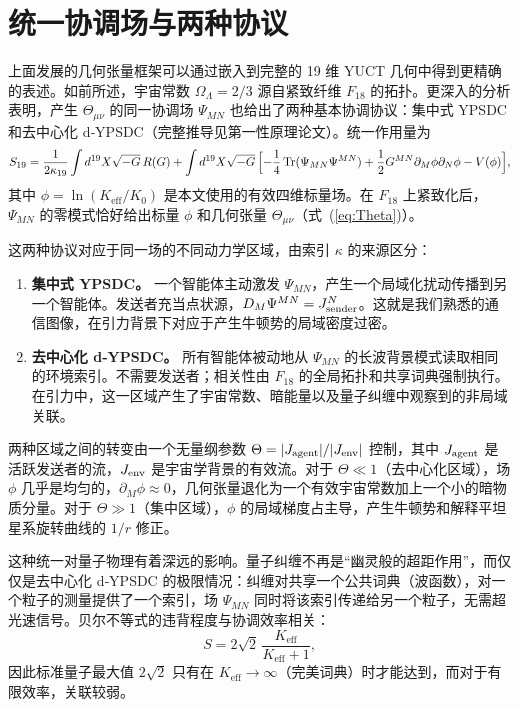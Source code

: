 \documentclass[12pt,a4paper]{article}
\DeclareMathOperator{\Tr}{Tr}
\begin{document}
	\section{统一协调场与两种协议}
	\label{sec:unified-protocols}
	
	上面发展的几何张量框架可以通过嵌入到完整的 19 维 YUCT 几何中得到更精确的表述。如前所述，宇宙常数 \(\Omega_\Lambda=2/3\) 源自紧致纤维 \(F_{18}\) 的拓扑。更深入的分析表明，产生 \(\Theta_{\mu\nu}\) 的同一协调场 \(\Psi_{MN}\) 也给出了两种基本协调协议：集中式 YPSDC 和去中心化 d‑YPSDC（完整推导见第一性原理论文）。统一作用量为
	\begin{equation}
		S_{19} = \frac{1}{2\kappa_{19}} \int d^{19}X \sqrt{-G}\, R(G)
		+ \int d^{19}X \sqrt{-G}\,
		\Bigl[ -\frac14 \Tr(\Psi_{MN}\Psi^{MN})
		+ \frac12 G^{MN}\partial_M\phi \partial_N\phi
		- V(\phi) \Bigr],
		\label{eq:unified-gravity}
	\end{equation}
	其中 \(\phi = \ln(K_{\mathrm{eff}}/K_0)\) 是本文使用的有效四维标量场。在 \(F_{18}\) 上紧致化后，\(\Psi_{MN}\) 的零模式恰好给出标量 \(\phi\) 和几何张量 \(\Theta_{\mu\nu}\)（式~(\ref{eq:Theta})）。
	
	这两种协议对应于同一场的不同动力学区域，由索引 \(\kappa\) 的来源区分：
	\begin{enumerate}[leftmargin=*]
		\item \textbf{集中式 YPSDC。} 一个智能体主动激发 \(\Psi_{MN}\)，产生一个局域化扰动传播到另一个智能体。发送者充当点状源，\(D_M\Psi^{MN} = J^N_{\rm sender}\)。这就是我们熟悉的通信图像，在引力背景下对应于产生牛顿势的局域密度过密。
		\item \textbf{去中心化 d‑YPSDC。} 所有智能体被动地从 \(\Psi_{MN}\) 的长波背景模式读取相同的环境索引。不需要发送者；相关性由 \(F_{18}\) 的全局拓扑和共享词典强制执行。在引力中，这一区域产生了宇宙常数、暗能量以及量子纠缠中观察到的非局域关联。
	\end{enumerate}
	
	两种区域之间的转变由一个无量纲参数 \(\Theta = |J_{\rm agent}| / |J_{\rm env}|\) 控制，其中 \(J_{\rm agent}\) 是活跃发送者的流，\(J_{\rm env}\) 是宇宙学背景的有效流。对于 \(\Theta\ll1\)（去中心化区域），场 \(\phi\) 几乎是均匀的，\(\partial_M\phi\approx0\)，几何张量退化为一个有效宇宙常数加上一个小的暗物质分量。对于 \(\Theta\gg1\)（集中区域），\(\phi\) 的局域梯度占主导，产生牛顿势和解释平坦星系旋转曲线的 \(1/r\) 修正。
	
	这种统一对量子物理有着深远的影响。量子纠缠不再是“幽灵般的超距作用”，而仅仅是去中心化 d‑YPSDC 的极限情况：纠缠对共享一个公共词典（波函数），对一个粒子的测量提供了一个索引，场 \(\Psi_{MN}\) 同时将该索引传递给另一个粒子，无需超光速信号。贝尔不等式的违背程度与协调效率相关：
	\begin{equation}
		S = 2\sqrt{2}\,\frac{K_{\mathrm{eff}}}{K_{\mathrm{eff}}+1},
		\label{eq:bell-eff}
	\end{equation}
	因此标准量子最大值 \(2\sqrt{2}\) 只有在 \(K_{\mathrm{eff}}\to\infty\)（完美词典）时才能达到，而对于有限效率，关联较弱。
	
\end{document}
